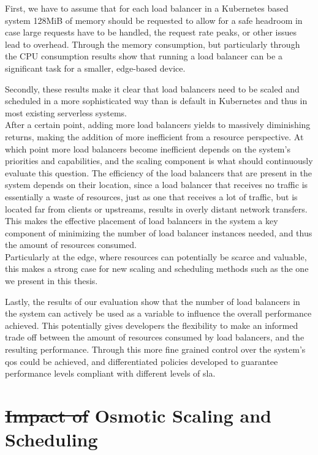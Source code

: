 \documentclass[draft,final]{vutinfth} %
\providecommand{\DIFdeltex}[1]{{\protect\color{red}\sout{#1}}}                      %
\providecommand{\DIFaddbegin}{} %
\providecommand{\DIFaddend}{} %
\providecommand{\DIFdelbegin}{} %
\providecommand{\DIFdelend}{} %
\providecommand{\DIFdel}[1]{\texorpdfstring{\DIFdeltex{#1}}{}} %
\begin{document}
First, we have to assume that for each load balancer in a Kubernetes based system 128MiB of memory should be requested to allow for a safe headroom in case large requests have to be handled, the request rate peaks, or other issues lead to overhead.
Through the memory consumption, but particularly through the CPU consumption results show that running a load balancer can be a significant task for a smaller, edge-based device.

Secondly, these results make it clear that load balancers need to be scaled and scheduled in a more sophisticated way than is default in Kubernetes and thus in most existing serverless systems.\\
After a certain point, adding more load balancers yields to massively diminishing returns, making the addition of more inefficient from a resource perspective.
At which point more load balancers become inefficient depends on the system's priorities and capabilities, and the scaling component is what should continuously evaluate this question.
The efficiency of the load balancers that are present in the system depends on their location, since a load balancer that receives no traffic is essentially a waste of resources, just as one that receives a lot of traffic, but is located far from clients or upstreams, results in overly distant network transfers.
This makes the effective placement of load balancers in the system a key component of minimizing the number of load balancer instances needed, and thus the amount of resources consumed.\\
Particularly at the edge, where resources can potentially be scarce and valuable, this makes a strong case for new scaling and scheduling methods such as the one we present in this thesis.

Lastly, the results of our evaluation show that the number of load balancers in the system can actively be used as a variable to influence the overall performance achieved.
This potentially gives developers the flexibility to make an informed trade off between the amount of resources consumed by load balancers, and the resulting performance.
Through this more fine grained control over the system's \gls{qos} could be achieved, and differentiated policies developed to guarantee performance levels compliant with different levels of \gls{sla}.
\DIFdelbegin %
\DIFdelend \DIFaddbegin 

\DIFaddend \section{\DIFdelbegin \DIFdel{Impact of }\DIFdelend Osmotic Scaling and Scheduling}
 \DIFdelbegin %
\DIFdelend %
\DIFaddbegin 
\end{document}
